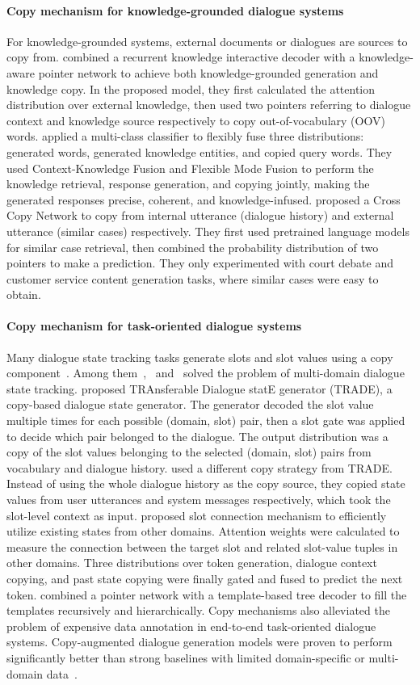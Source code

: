 \paragraph*{Copy mechanism for knowledge-grounded dialogue systems} For knowledge-grounded systems, external documents or dialogues are sources to copy from.  combined a recurrent knowledge interactive decoder with a knowledge-aware pointer network to achieve both knowledge-grounded generation and knowledge copy. In the proposed model, they first calculated the attention distribution over external knowledge, then used two pointers referring to dialogue context and knowledge source respectively to copy out-of-vocabulary (OOV) words.  applied a multi-class classifier to flexibly fuse three distributions: generated words, generated knowledge entities, and copied query words. They used Context-Knowledge Fusion and Flexible Mode Fusion to perform the knowledge retrieval, response generation, and copying jointly, making the generated responses precise, coherent, and knowledge-infused.  proposed a Cross Copy Network to copy from internal utterance (dialogue history) and external utterance (similar cases) respectively. They first used pretrained language models for similar case retrieval, then combined the probability distribution of two pointers to make a prediction. They only experimented with court debate and customer service content generation tasks, where similar cases were easy to obtain. 
\paragraph*{Copy mechanism for task-oriented dialogue systems} Many dialogue state tracking tasks generate slots and slot values using a copy component~. Among them~,~ and~ solved the problem of multi-domain dialogue state tracking.  proposed TRAnsferable Dialogue statE generator (TRADE), a copy-based dialogue state generator. The generator decoded the slot value multiple times for each possible (domain, slot) pair, then a slot gate was applied to decide which pair belonged to the dialogue. The output distribution was a copy of the slot values belonging to the selected (domain, slot) pairs from vocabulary and dialogue history.  used a different copy strategy from TRADE. Instead of using the whole dialogue history as the copy source, they copied state values from user utterances and system messages respectively, which took the slot-level context as input.  proposed slot connection mechanism to efficiently utilize existing states from other domains. Attention weights were calculated to measure the connection between the target slot and related slot-value tuples in other domains. Three distributions over token generation, dialogue context copying, and past state copying were finally gated and fused to predict the next token.  combined a pointer network with a template-based tree decoder to fill the templates recursively and hierarchically. Copy mechanisms also alleviated the problem of expensive data annotation in end-to-end task-oriented dialogue systems. Copy-augmented dialogue generation models were proven to perform significantly better than strong baselines with limited domain-specific or multi-domain data~. 
